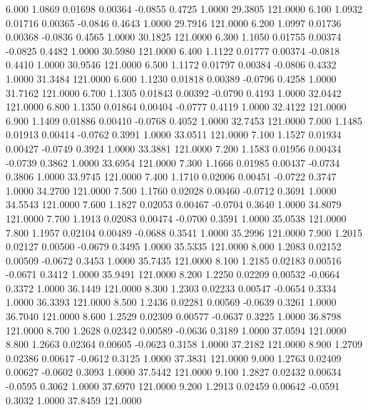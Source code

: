    6.000   1.0869   0.01698   0.00364  -0.0855   0.4725   1.0000  29.3805 121.0000
   6.100   1.0932   0.01716   0.00365  -0.0846   0.4643   1.0000  29.7916 121.0000
   6.200   1.0997   0.01736   0.00368  -0.0836   0.4565   1.0000  30.1825 121.0000
   6.300   1.1050   0.01755   0.00374  -0.0825   0.4482   1.0000  30.5980 121.0000
   6.400   1.1122   0.01777   0.00374  -0.0818   0.4410   1.0000  30.9546 121.0000
   6.500   1.1172   0.01797   0.00384  -0.0806   0.4332   1.0000  31.3484 121.0000
   6.600   1.1230   0.01818   0.00389  -0.0796   0.4258   1.0000  31.7162 121.0000
   6.700   1.1305   0.01843   0.00392  -0.0790   0.4193   1.0000  32.0442 121.0000
   6.800   1.1350   0.01864   0.00404  -0.0777   0.4119   1.0000  32.4122 121.0000
   6.900   1.1409   0.01886   0.00410  -0.0768   0.4052   1.0000  32.7453 121.0000
   7.000   1.1485   0.01913   0.00414  -0.0762   0.3991   1.0000  33.0511 121.0000
   7.100   1.1527   0.01934   0.00427  -0.0749   0.3924   1.0000  33.3881 121.0000
   7.200   1.1583   0.01956   0.00434  -0.0739   0.3862   1.0000  33.6954 121.0000
   7.300   1.1666   0.01985   0.00437  -0.0734   0.3806   1.0000  33.9745 121.0000
   7.400   1.1710   0.02006   0.00451  -0.0722   0.3747   1.0000  34.2700 121.0000
   7.500   1.1760   0.02028   0.00460  -0.0712   0.3691   1.0000  34.5543 121.0000
   7.600   1.1827   0.02053   0.00467  -0.0704   0.3640   1.0000  34.8079 121.0000
   7.700   1.1913   0.02083   0.00474  -0.0700   0.3591   1.0000  35.0538 121.0000
   7.800   1.1957   0.02104   0.00489  -0.0688   0.3541   1.0000  35.2996 121.0000
   7.900   1.2015   0.02127   0.00500  -0.0679   0.3495   1.0000  35.5335 121.0000
   8.000   1.2083   0.02152   0.00509  -0.0672   0.3453   1.0000  35.7435 121.0000
   8.100   1.2185   0.02183   0.00516  -0.0671   0.3412   1.0000  35.9491 121.0000
   8.200   1.2250   0.02209   0.00532  -0.0664   0.3372   1.0000  36.1449 121.0000
   8.300   1.2303   0.02233   0.00547  -0.0654   0.3334   1.0000  36.3393 121.0000
   8.500   1.2436   0.02281   0.00569  -0.0639   0.3261   1.0000  36.7040 121.0000
   8.600   1.2529   0.02309   0.00577  -0.0637   0.3225   1.0000  36.8798 121.0000
   8.700   1.2628   0.02342   0.00589  -0.0636   0.3189   1.0000  37.0594 121.0000
   8.800   1.2663   0.02364   0.00605  -0.0623   0.3158   1.0000  37.2182 121.0000
   8.900   1.2709   0.02386   0.00617  -0.0612   0.3125   1.0000  37.3831 121.0000
   9.000   1.2763   0.02409   0.00627  -0.0602   0.3093   1.0000  37.5442 121.0000
   9.100   1.2827   0.02432   0.00634  -0.0595   0.3062   1.0000  37.6970 121.0000
   9.200   1.2913   0.02459   0.00642  -0.0591   0.3032   1.0000  37.8459 121.0000
